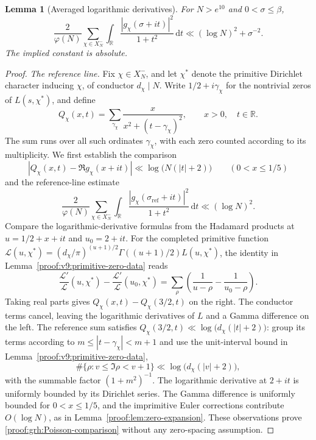 \documentclass[12pt,a4paper]{amsart}
\numberwithin{equation}{section}
\def\le{\leqslant}
\theoremstyle{plain}
\newtheorem{lemma}[proposition]{Lemma}
\theoremstyle{definition}
\theoremstyle{remark}
\begin{document}
\begin{lemma}[Averaged logarithmic derivatives]
\label{proof:grh:averaged-energy-lemma}
For $N>e^{10}$ and $0<\sigma\le\beta$,
\begin{equation}\label{grh:averaged-energy}
 \frac2{\varphi(N)}\sum_{\chi\in X_N^-}
 \int_{\mathbb R}\frac{|g_\chi(\sigma+it)|^2}{1+t^2}\,\mathrm{d}t
 \ll(\log N)^2+\sigma^{-2}.
\end{equation}
The implied constant is absolute.
\end{lemma}

\begin{proof}
\emph{The reference line.}
Fix $\chi\in X_N^-$, and let $\chi^*$ denote the primitive
Dirichlet character inducing $\chi$, of conductor $d_\chi\mid N$.
Write $1/2+i\gamma_\chi$ for the nontrivial zeros of
$L(s,\chi^*)$, and define
\[
 Q_\chi(x,t)=\sum_{\gamma_\chi}
             \frac{x}{x^2+(t-\gamma_\chi)^2},
 \qquad x>0,\quad t\in\mathbb R.
\]
The sum runs over all such ordinates $\gamma_\chi$, with each zero
counted according to its multiplicity.
We first establish the comparison
\begin{equation}\label{proof:grh:Poisson-comparison}
 |Q_\chi(x,t)-\Re g_\chi(x+it)|
       \ll\log\bigl(N(|t|+2)\bigr)
 \qquad(0<x\le1/5)
\end{equation}
and the reference-line estimate
\begin{equation}\label{proof:v7l:reference-energy-bound}
 \frac2{\varphi(N)}\sum_{\chi\in X_N^-}
 \int_{\mathbb R}\frac{|g_\chi(\sigma_{\mathrm{ref}}+it)|^2}{1+t^2}\,\mathrm{d}t
 \ll(\log N)^2.
\end{equation}
Compare the logarithmic-derivative formulas from the Hadamard
products at $u=1/2+x+it$ and $u_0=2+it$.
For the completed primitive function
$\mathcal L(u,\chi^*)=(d_\chi/\pi)^{(u+1)/2}
\Gamma((u+1)/2)L(u,\chi^*)$, the identity in
Lemma~\ref{proof:v9:primitive-zero-data} reads
\[
 \frac{\mathcal L'}{\mathcal L}(u,\chi^*)
 -\frac{\mathcal L'}{\mathcal L}(u_0,\chi^*)
 =\sum_\rho\left(\frac1{u-\rho}-\frac1{u_0-\rho}\right).
\]
Taking real parts gives $Q_\chi(x,t)-Q_\chi(3/2,t)$ on the
right. The conductor terms cancel, leaving the logarithmic
derivatives of $L$ and a Gamma difference on the left.
The reference sum satisfies
$Q_\chi(3/2,t)\ll\log\bigl(d_\chi(|t|+2)\bigr)$:
group its terms according to
$m\le|t-\gamma_\chi|<m+1$ and use
the unit-interval bound in Lemma~\ref{proof:v9:primitive-zero-data},
\[
 \#\{\rho:v\le\Im\rho<v+1\}
 \ll\log\bigl(d_\chi(|v|+2)\bigr),
\]
with the summable factor $(1+m^2)^{-1}$.
The logarithmic derivative at $2+it$
is uniformly bounded by its Dirichlet series. The Gamma
difference is uniformly bounded for $0<x\le1/5$, and the imprimitive
Euler corrections contribute $O(\log N)$, as in
Lemma~\ref{proof:lem:zero-expansion}. These observations prove
\eqref{proof:grh:Poisson-comparison} without any zero-spacing assumption.


\end{proof}
\end{document}
